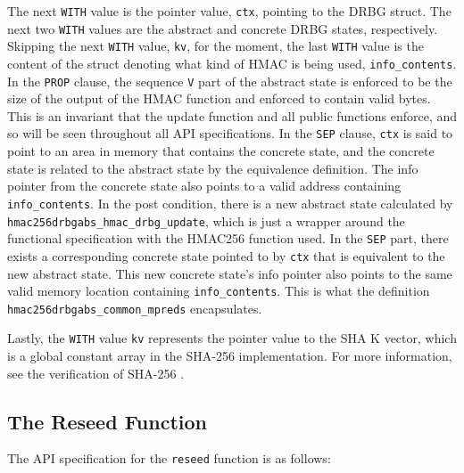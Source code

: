\documentclass[pageno]{jpaper}
\begin{document}
The next \lstinline{WITH} value is the pointer value, \lstinline{ctx}, pointing to the DRBG struct. The next two \lstinline{WITH} values are the abstract and concrete DRBG states, respectively. Skipping the next \lstinline{WITH} value, \lstinline{kv}, for the moment, the last \lstinline{WITH} value is the content of the struct denoting what kind of HMAC is being used, \lstinline{info_contents}. In the \lstinline{PROP} clause, the sequence \lstinline{V} part of the abstract state is enforced to be the size of the output of the HMAC function and enforced to contain valid bytes. This is an invariant that the update function and all public functions enforce, and so will be seen throughout all API specifications. In the \lstinline{SEP} clause, \lstinline{ctx} is said to point to an area in memory that contains the concrete state, and the concrete state is related to the abstract state by the equivalence definition. The info pointer from the concrete state also points to a valid address containing \lstinline{info_contents}. In the post condition, there is a new abstract state calculated by \lstinline{hmac256drbgabs_hmac_drbg_update}, which is just a wrapper around the functional specification with the HMAC256 function used. In the \lstinline{SEP} part, there exists a corresponding concrete state pointed to by \lstinline{ctx} that is equivalent to the new abstract state. This new concrete state’s info pointer also points to the same valid memory location containing \lstinline{info_contents}. This is what the definition \lstinline{hmac256drbgabs_common_mpreds} encapsulates.

Lastly, the \lstinline{WITH} value \lstinline{kv} represents the pointer value to the SHA K vector, which is a global constant array in the SHA-256 implementation. For more information, see the verification of SHA-256 \cite{sha}.

\subsection{The Reseed Function}

The API specification for the \lstinline{reseed} function is as follows:
\end{document}
